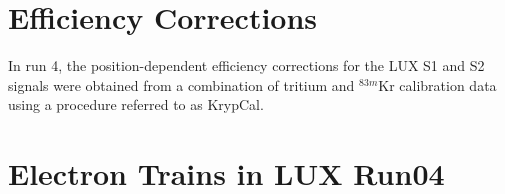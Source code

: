  
 \section{Efficiency Corrections}\label{sec:krypcal}
 In run 4, the position-dependent efficiency corrections for the LUX S1 and S2 signals were obtained from a combination of tritium and $^{83m}$Kr calibration data using a procedure referred to as KrypCal\cite{richard}.  
 
\section{Electron Trains in LUX Run04} \label{sec:etrain}
 